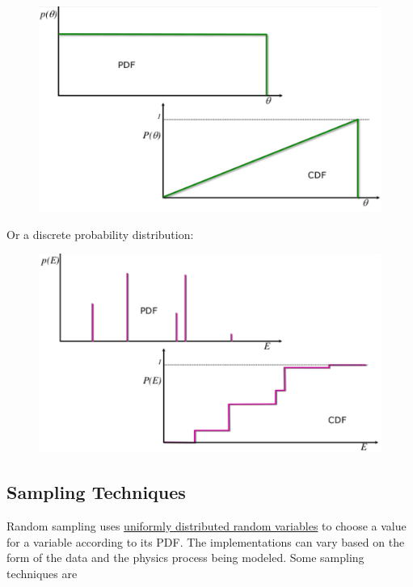 \documentclass[12pt]{article}
\begin{document}
\begin{figure}[h!]
\begin{center}
\includegraphics[scale=0.55]{../figs/pdf-cdf.png}
\end{center}
\end{figure}

Or a discrete probability distribution:

\begin{figure}[ht!]
\begin{center}
\includegraphics[scale=0.55]{../figs/discretePDF-CDF.png}
\end{center}
\end{figure}


\subsection*{Sampling Techniques}

Random sampling uses \underline{uniformly distributed random variables} to choose a value for a variable according to its PDF.  
The implementations can vary based on the form of the data and the physics process being modeled.
Some sampling techniques are
\end{document}
